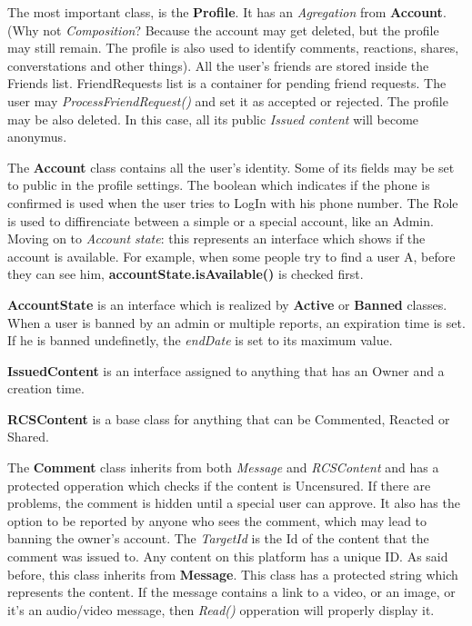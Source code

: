 \documentclass{article}
\begin{document}
		\bigskip
		The most important class, is the \textbf{Profile}. It has an \textit{Agregation} from \textbf{Account}. (Why not \textit{Composition}? Because the account may get deleted, but the profile may still remain. The profile is also used to identify comments, reactions, shares, converstations and other things). All the user's friends are stored inside the Friends list. FriendRequests list is a container for pending friend requests. The user may \textit{ProcessFriendRequest()} and set it as accepted or rejected. The profile may be also deleted. In this case, all its public \textit{Issued content} will become anonymus.

		\bigskip
		The \textbf{Account} class contains all the user's identity. Some of its fields may be set to public in the profile settings. The boolean which indicates if the phone is confirmed is used when the user tries to LogIn with his phone number. The Role is used to diffirenciate between a simple or a special account, like an Admin. Moving on to \textit{Account state}: this represents an interface which shows if the account is available. For example, when some people try to find a user A, before they can see him, \textbf{accountState.isAvailable()} is checked first.

		\bigskip
		\textbf{AccountState} is an interface which is realized by \textbf{Active} or \textbf{Banned} classes. When a user is banned by an admin or multiple reports, an expiration time is set. If he is banned undefinetly, the \textit{endDate} is set to its maximum value.

		\bigskip
		\textbf{IssuedContent} is an interface assigned to anything that has an Owner and a creation time.

		\bigskip
		\textbf{RCSContent} is a base class for anything that can be Commented, Reacted or Shared.

		\bigskip
		The \textbf{Comment} class inherits from both \textit{Message} and \textit{RCSContent} and has a protected opperation which checks if the content is Uncensured. If there are problems, the comment is hidden until a special user can approve. It also has the option to be reported by anyone who sees the comment, which may lead to banning the owner's account. The \textit{TargetId} is the Id of the content that the comment was issued to. Any content on this platform has a unique ID. As said before, this class inherits from \textbf{Message}. This class has a protected string which represents the content. If the message contains a link to a video, or an image, or it's an audio/video message, then \textit{Read()} opperation will properly display it.
\end{document}
